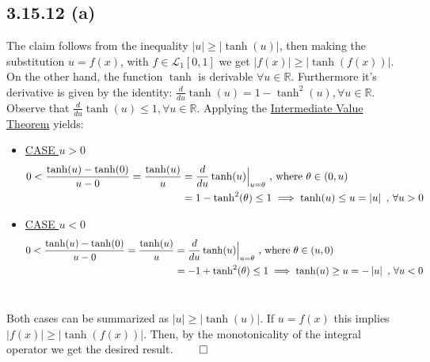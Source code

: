 \documentclass{exam}
\renewenvironment{proof}{{\noindent\itshape\ignorespaces}}{{\hfill$\qed$\\}}
\begin{document}
\subsection*{3.15.12 (a)}
The claim follows from the inequality $\left| u \right|  \geq \left|\tanh(u) \right|$,  then making the substitution $u = f(x)$, with $f \in \mathcal{L}_1[0,1]$ we get $\left| f(x) \right|  \geq \left|\tanh(f(x)) \right|$. On the other hand, the function $\tanh$ is derivable $\forall u \in \mathbb{R}$. Furthermore it's derivative is 
given by the identity: $\displaystyle \frac{d}{du} \tanh(u) = 1 - \tanh^{2}(u), \forall u \in \mathbb{R}$. Observe that $\displaystyle \frac{d}{du} \tanh(u) \leq 1, \forall u \in \mathbb{R}$. Applying the \href{https://en.wikipedia.org/wiki/Intermediate_value_theorem}{Intermediate Value Theorem} yields:\\
\begin{proof}
    \begin{itemize}
        \item  \underline{CASE $u>0$}\\
                \begin{equation*}
                    \begin{aligned}
                        0 < \displaystyle \frac{\tanh(u) - \tanh(0)}{u - 0} = \displaystyle \frac{\tanh(u)}{u}  &=  \displaystyle \frac{d}{du} \tanh(u) {\Big|}_{\tiny u=\theta} \text{ , where $\theta \in (0,u)$}\\
                            &= 1 - \tanh^{2}(\theta) \leq 1 \implies \tanh(u) \leq u = \left| u\right| \ \text{,} \ \forall u > 0
                    \end{aligned}    
                \end{equation*}
                
        \item  \underline{CASE $u<0$}\\
                \begin{equation*}
                    \begin{aligned}
                        0 < \displaystyle \frac{\tanh(u) - \tanh(0)}{u - 0} = \displaystyle \frac{\tanh(u)}{u}  &=  \displaystyle \frac{d}{du} \tanh(u) {\Big|}_{\tiny u=\theta} \text{ , where $\theta \in (u,0)$}\\
                            &=  -1 + \tanh^{2}(\theta) \leq 1 \implies \tanh(u) \geq u = - \left| u\right| \ \text{,} \ \forall u < 0
                    \end{aligned}    
                \end{equation*}\\            
    \end{itemize}
    Both cases can be summarized as $\left| u \right|  \geq \left|\tanh(u) \right|$. If $u = f(x)$ this implies $\left| f(x) \right|  \geq \left|\tanh(f(x)) \right|$. Then, by the monotonicality of 
    the integral operator we get the desired result.
\end{proof}
\end{document}
